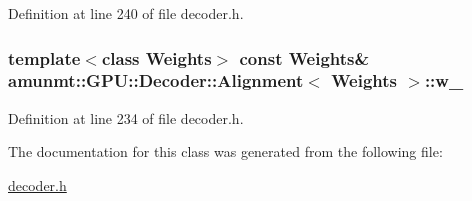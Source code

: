 Definition at line 240 of file decoder.\+h.

\subsubsection[{\texorpdfstring{w\+\_\+}{w_}}]{\setlength{\rightskip}{0pt plus 5cm}template$<$class Weights$>$ const {\bf Weights}\& {\bf amunmt\+::\+G\+P\+U\+::\+Decoder\+::\+Alignment}$<$ {\bf Weights} $>$\+::w\+\_\+\hspace{0.3cm}{\ttfamily [private]}}\hypertarget{classamunmt_1_1GPU_1_1Decoder_1_1Alignment_a76259ec6506c944eb14b820b507be817}{}\label{classamunmt_1_1GPU_1_1Decoder_1_1Alignment_a76259ec6506c944eb14b820b507be817}


Definition at line 234 of file decoder.\+h.



The documentation for this class was generated from the following file\+:\begin{DoxyCompactItemize}
\item 
\hyperlink{decoder_8h}{decoder.\+h}\end{DoxyCompactItemize}
